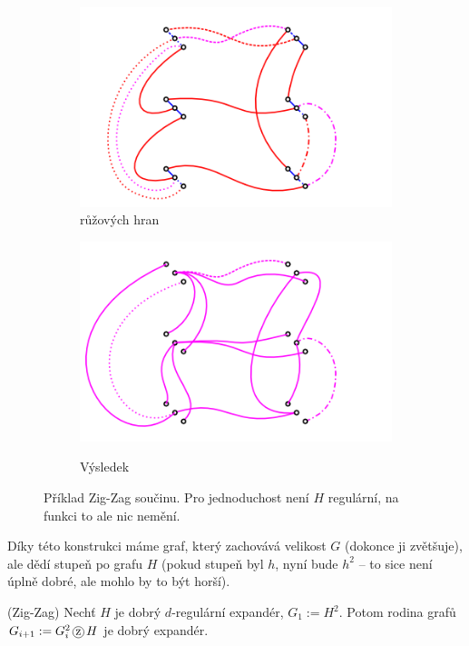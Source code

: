 \begin{figure}
\begin{subfigure}{7.5cm}{\includegraphics[width=\textwidth]{img/zigzag3.png}}
{růžových hran}\end{subfigure}
\begin{subfigure}{7.5cm}{\includegraphics[width=\textwidth]{img/zigzag4.png}}\caption{Výsledek}\end{subfigure}
\caption{Příklad Zig-Zag součinu. Pro jednoduchost není $H$ regulární, na funkci
to ale nic nemění.}
\label{zigzag-konstrukce}
\end{figure}

\poz Díky této konstrukci máme graf, který zachovává velikost $G$ (dokonce ji
zvětšuje), ale dědí stupeň po grafu $H$ (pokud stupeň byl $h$, nyní bude $h^2$
-- to sice není úplně dobré, ale mohlo by to být horší).

\vt (Zig-Zag) Nechť $H$ je dobrý $d$-regulární expandér, $G_1 := H^2$. Potom
rodina grafů $G_{i+1} := G^2_i\zz H$ je dobrý expandér.
